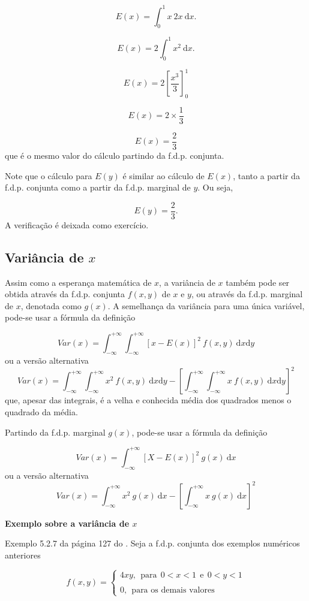 \documentclass[
]{book}
\begin{document}
\[
  E(x) = \int_{0}^{1} x~2x~\text{d}x.
\]

\[
  E(x) = 2\int_{0}^{1} x^2~\text{d}x.
\]

\[
  E(x) = 2\left[ \dfrac{x^3}{3} \right]_{0}^{1}
\]

\[
  E(x) = 2 \times \frac{1}{3}
\]

\[
  E(x) = \frac{2}{3}
\]
que é o mesmo valor do cálculo partindo da f.d.p. conjunta.

Note que o cálculo para \(E(y)\) é similar ao cálculo de \(E(x)\), tanto a partir da f.d.p. conjunta como a partir da f.d.p. marginal de \(y\). Ou seja,

\[
  E(y) = \dfrac{2}{3}.
\]
A verificação é deixada como exercício.

\hypertarget{variuxe2ncia-de-x}{%
\subsection{\texorpdfstring{Variância de \(x\)}{Variância de x}}\label{variuxe2ncia-de-x}}

Assim como a esperança matemática de \(x\), a variância de \(x\) também pode ser obtida através da f.d.p. conjunta \(f(x,y)\) de \(x\) e \(y\), ou através da f.d.p. marginal de \(x\), denotada como \(g(x)\). A semelhança da variância para uma única variável, pode-se usar a fórmula da definição

\[
  Var(x) = \int_{-\infty}^{+\infty} \int_{-\infty}^{+\infty}[x - E(x)]^2~f(x,y) ~\text{d}x \text{d}y
\]
ou a versão alternativa
\[
  Var(x) = \int_{-\infty}^{+\infty}\int_{-\infty}^{+\infty} x^2~f(x,y)~\text{d}x\text{d}y - \left[ \int_{-\infty}^{+\infty}\int_{-\infty}^{+\infty}x~f(x,y)~\text{d}x \text{d}y \right]^2
\]
que, apesar das integrais, é a velha e conhecida média dos quadrados menos o quadrado da média.

Partindo da f.d.p. marginal \(g(x)\), pode-se usar a fórmula da definição

\[
  Var(x) = \int_{-\infty}^{+\infty}[X - E(x)]^2~g(x) ~\text{d}x
\]
ou a versão alternativa
\[
  Var(x) = \int_{-\infty}^{+\infty} x^2~g(x)~\text{d}x - \left[ \int_{-\infty}^{+\infty}x~g(x)~\text{d}x \right]^2
\]

\textbf{Exemplo sobre a variância de \(x\)}

Exemplo 5.2.7 da página 127 do \citet{Sartoris2013}. Seja a f.d.p. conjunta dos exemplos numéricos anteriores

\begin{equation}
  f(x,y) = 
    \begin{cases}
      4xy,~~\text{para}~~0 < x < 1~~\text{e}~~0 < y < 1 \\
      \\
      0, ~~\text{para os demais valores}
    \end{cases}
\end{equation}
\end{document}
